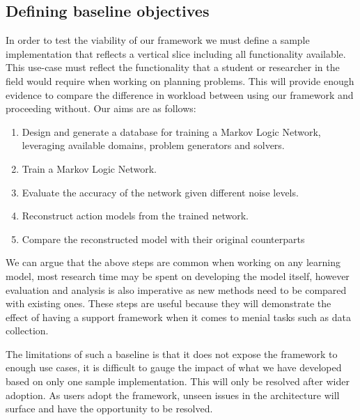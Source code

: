 \subsection{Defining baseline objectives}
In order to test the viability of our framework we must define a sample implementation that reflects a vertical slice including all functionality available.
This use-case must reflect the functionality that a student or researcher in the field would require when working on planning problems.
This will provide enough evidence to compare the difference in workload between using our framework and proceeding without. Our aims are as follows:
\begin{enumerate}
    \item Design and generate a database for training a Markov Logic Network, leveraging available domains, problem generators and solvers.
    \item Train a Markov Logic Network.
    \item Evaluate the accuracy of the network given different noise levels.
    \item Reconstruct action models from the trained network.
    \item Compare the reconstructed model with their original counterparts
\end{enumerate}
We can argue that the above steps are common when working on any learning model, most research time may be spent on developing the model itself, however evaluation and analysis is also imperative as new methods need to be compared with existing ones. These steps are useful because they will demonstrate the effect of having a support framework when it comes to menial tasks such as data collection.

The limitations of such a baseline is that it does not expose the framework to enough use cases, it is difficult to gauge the impact of what we have developed based on only one sample implementation. This will only be resolved after wider adoption. As users adopt the framework, unseen issues in the architecture will surface and have the opportunity to be resolved.





\newpage
